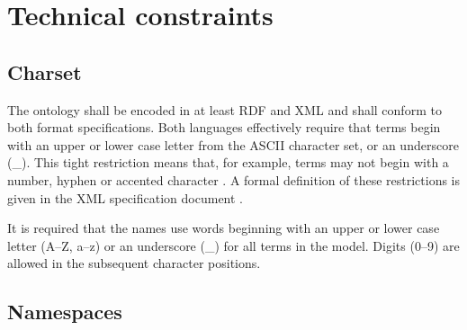 \section{Technical constraints}
\label{sec:technical}
	
	
	\subsection{Charset}
	\label{sec:charset}
	
	The ontology shall be encoded in at least RDF \cite{rdf11} and XML\cite{xml1-spec} and shall conform to both format specifications. Both languages effectively require that terms begin with an upper or lower case letter from the ASCII character set, or an underscore (\_). This tight restriction means that, for example, terms may not begin with a number, hyphen or accented character \cite{d3.1-2015}. A formal definition of these restrictions is given in the XML specification document \cite{xml1-spec}.
	
	It is required that the names use words beginning with an upper or lower case letter (A--Z, a--z) or an underscore (\_) for all terms in the model. Digits (0--9) are allowed in the subsequent character positions.
	
	\subsection{Namespaces}
	\label{sec:namespaces}